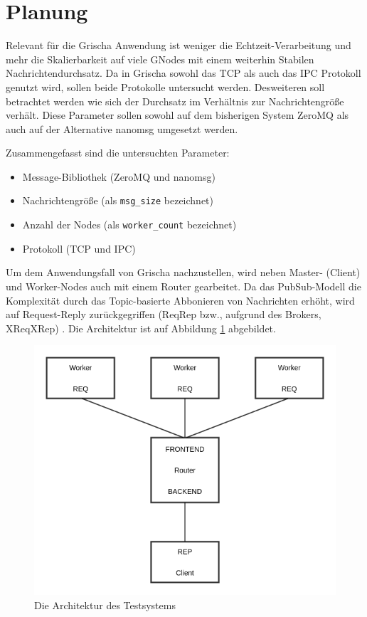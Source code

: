 \documentclass{article}
\begin{document}
\section{Planung}
Relevant für die Grischa Anwendung ist weniger die Echtzeit-Verarbeitung
und mehr die Skalierbarkeit auf viele GNodes mit einem weiterhin
Stabilen Nachrichtendurchsatz. Da in Grischa sowohl das TCP als auch das
IPC Protokoll genutzt wird, sollen beide Protokolle untersucht werden.
Desweiteren soll betrachtet werden wie sich der Durchsatz im Verhältnis
zur Nachrichtengröße verhält. Diese Parameter sollen sowohl auf dem
bisherigen System ZeroMQ als auch auf der Alternative nanomsg umgesetzt
werden.

Zusammengefasst sind die untersuchten Parameter:
\begin{itemize}
\itemsep4pt\parskip0pt
    \item
    Message-Bibliothek (ZeroMQ und nanomsg)
    \item
    Nachrichtengröße (als \texttt{msg\_size} bezeichnet) 
    \item
    Anzahl der Nodes (als \texttt{worker\_count} bezeichnet) 
    \item
  Protokoll (TCP und IPC)
\end{itemize}

Um dem Anwendungsfall von Grischa nachzustellen, wird neben Master-
(Client) und Worker-Nodes auch mit einem Router gearbeitet. Da das
PubSub-Modell die Komplexität durch das Topic-basierte Abbonieren von
Nachrichten erhöht, wird auf Request-Reply zurückgegriffen (ReqRep bzw.,
aufgrund des Brokers, XReqXRep) \cite{noauthor_xsub-xpub_nodate}. Die Architektur ist auf Abbildung \ref{figgure:architecture_testsystem} abgebildet.

\begin{figure}[htbp]
\centering
\includegraphics[width=12cm]{./images/architecture.png}
\caption{Die Architektur des Testsystems}
\label{figgure:architecture_testsystem}
\end{figure}
\end{document}

